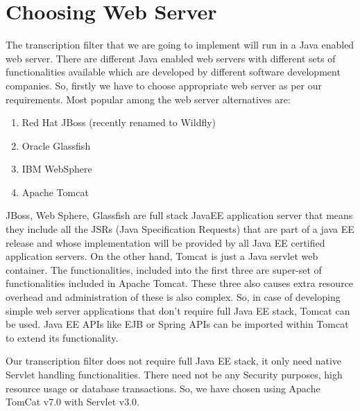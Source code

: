 \documentclass[12pt,oneside,openany,a4paper]{book}
\begin{document}
\section{Choosing Web Server}
The transcription filter that we are going to implement will run in a Java enabled web server. There are different Java enabled web servers with different sets of functionalities available which are developed by different software development companies. So, firstly we have to choose appropriate web server as per our requirements. Most popular among the web server alternatives are:
		\begin{enumerate}[leftmargin=0.7in]
			\item {Red Hat JBoss (recently renamed to Wildfly)} 
			\item {Oracle Glassfish} 
			\item {IBM WebSphere} 
			\item {Apache Tomcat} 
		\end{enumerate}

	  JBoss, Web Sphere, Glassfish are full stack JavaEE application server that means they include all the JSRs (Java Specification Requests) that are part of a java EE release and whose implementation will be provided by all Java EE certified application servers. On the other hand, Tomcat is just a Java servlet web container. The functionalities, included into the first three are super-set of functionalities included in Apache Tomcat. These three also causes extra resource overhead and administration of these is also complex. So, in case of developing simple web server applications that don't require full Java EE stack, Tomcat can be used. Java EE APIs like EJB or Spring APIs can be imported within Tomcat to extend its functionality. 
\par \vspace{0.3cm}
	Our transcription filter does not require full Java EE stack, it only need native Servlet handling functionalities. There need not be any Security purposes, high resource usage or database transactions. So, we have chosen using Apache TomCat v7.0 with Servlet v3.0.	
	
\end{document}
